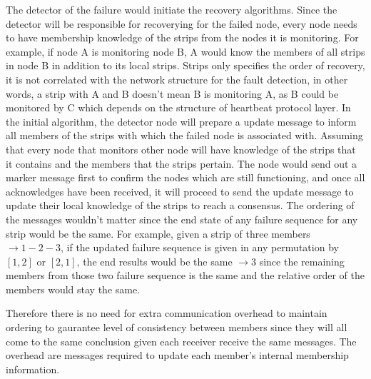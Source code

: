 
The detector of the failure would initiate the recovery algorithms.
Since the detector will be responsible for recoverying for the failed node,
every node needs to have membership knowledge of the strips from the nodes it
is monitoring. For example, if node A is monitoring node B, A would know the
members of all strips in node B in addition to its local strips. Strips only
specifies the order of recovery, it is not correlated with the network
structure for the fault detection, in other words, a strip with A and B doesn't
mean B is monitoring A, as B could be monitored by C which depends on the
structure of heartbeat protocol layer.
In the initial algorithm, the detector node will prepare a update message to
inform all members of the strips with which the failed node is associated with.
Assuming that every node that monitors other node will have knowledge of the
strips that it contains and the members that the strips pertain. The node would
send out a marker message first to confirm the nodes which are still
functioning, and once all acknowledges have been received, it will proceed to
send the update message to update their local knowledge of the strips to reach
a consensus. The ordering of the messages wouldn't matter since the end state
of any failure sequence for any strip would be the same. For example, given
a strip of three members $\rightarrow 1-2-3$, if the updated failure sequence
is given in any permutation by $[1, 2]$ or $[2, 1]$, the end results would be
the same $\rightarrow 3$ since the remaining members from those two failure
sequence is the same and the relative order of the members would stay the same.

Therefore there is no need for extra communication overhead to maintain
ordering to gaurantee level of consistency between members since they will all
come to the same conclusion given each receiver receive the same messages. The
overhead are messages required to update each member's internal membership
information.


